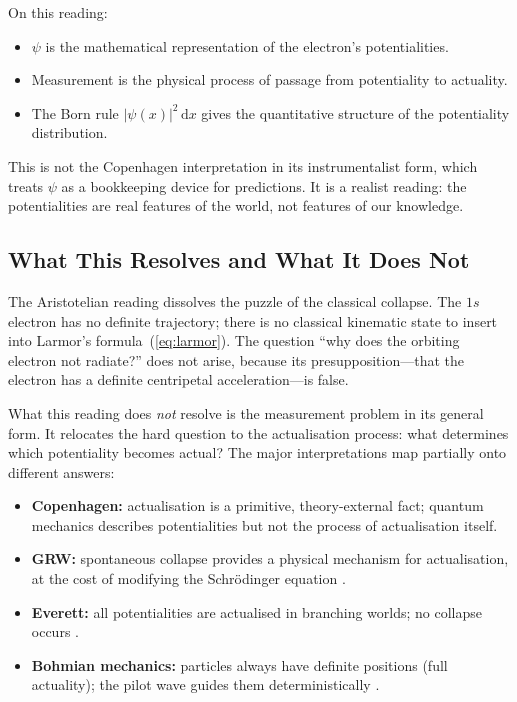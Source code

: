 \medskip

On this reading:
\begin{itemize}
  \item $\psi$ is the mathematical representation of the electron's potentialities.
  \item Measurement is the physical process of passage from potentiality to actuality.
  \item The Born rule $|\psi(x)|^2\,\mathrm{d}x$ gives the quantitative structure of the potentiality distribution.
\end{itemize}

This is not the Copenhagen interpretation in its instrumentalist form, which treats $\psi$ as a bookkeeping device for predictions. It is a realist reading: the potentialities are real features of the world, not features of our knowledge.

\medskip


\subsection{What This Resolves and What It Does Not}

The Aristotelian reading dissolves the puzzle of the classical collapse. The $1s$ electron has no definite trajectory; there is no classical kinematic state to insert into Larmor's formula~(\ref{eq:larmor}). The question ``why does the orbiting electron not radiate?'' does not arise, because its presupposition---that the electron has a definite centripetal acceleration---is false.

\medskip

What this reading does \textit{not} resolve is the measurement problem in its general form. It relocates the hard question to the actualisation process: what determines which potentiality becomes actual? The major interpretations map partially onto different answers:

\begin{itemize}
  \item \textbf{Copenhagen:} actualisation is a primitive, theory-external fact; quantum mechanics describes potentialities but not the process of actualisation itself.
  \item \textbf{GRW:} spontaneous collapse provides a physical mechanism for actualisation, at the cost of modifying the Schr\"{o}dinger equation \cite{ghirardi_1986_unified}.
  \item \textbf{Everett:} all potentialities are actualised in branching worlds; no collapse occurs \cite{everett_1957_relativestate}.
  \item \textbf{Bohmian mechanics:} particles always have definite positions (full actuality); the pilot wave guides them deterministically \cite{bohm_1952_hiddenvariables}.
\end{itemize}

